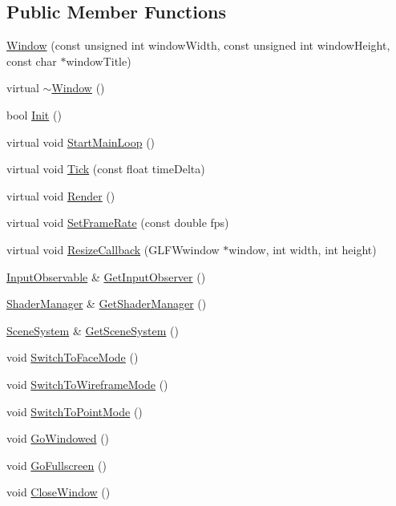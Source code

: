 \subsection*{Public Member Functions}
\begin{DoxyCompactItemize}
\item 
\mbox{\hyperlink{classngl_1_1_window_ab16003928f7ee5751be23bd3ae14667d}{Window}} (const unsigned int window\+Width, const unsigned int window\+Height, const char $\ast$window\+Title)
\item 
virtual \mbox{\hyperlink{classngl_1_1_window_a4cc0bbb6a8683eb7feadabba9f5aab8f}{$\sim$\+Window}} ()
\item 
bool \mbox{\hyperlink{classngl_1_1_window_afbeb6963b94db2831f85fff3d9a53df5}{Init}} ()
\item 
virtual void \mbox{\hyperlink{classngl_1_1_window_a93674843d11e58d9472dca7d26638211}{Start\+Main\+Loop}} ()
\item 
virtual void \mbox{\hyperlink{classngl_1_1_window_aa75f0944d26e5161a05bacb67bf55dd5}{Tick}} (const float time\+Delta)
\item 
virtual void \mbox{\hyperlink{classngl_1_1_window_a01094d06a54253996eb2b5292b3351ef}{Render}} ()
\item 
virtual void \mbox{\hyperlink{classngl_1_1_window_acc27f50ef366e58cd449a7a639e927e1}{Set\+Frame\+Rate}} (const double fps)
\item 
virtual void \mbox{\hyperlink{classngl_1_1_window_ad5cd882ac020e43720420edf5ce37179}{Resize\+Callback}} (G\+L\+F\+Wwindow $\ast$window, int width, int height)
\item 
\mbox{\hyperlink{classngl_1_1_input_observable}{Input\+Observable}} \& \mbox{\hyperlink{classngl_1_1_window_a82e6eafdce102fde3a240a31bcc79d70}{Get\+Input\+Observer}} ()
\item 
\mbox{\hyperlink{classngl_1_1_shader_manager}{Shader\+Manager}} \& \mbox{\hyperlink{classngl_1_1_window_a673b8e3b7d1f598120ef7ea5df20b64a}{Get\+Shader\+Manager}} ()
\item 
\mbox{\hyperlink{classngl_1_1_scene_system}{Scene\+System}} \& \mbox{\hyperlink{classngl_1_1_window_a2ab238e35cd9cdc3863ccf16cae5992a}{Get\+Scene\+System}} ()
\item 
void \mbox{\hyperlink{classngl_1_1_window_a2904a42ae067cc48627d0742518bc341}{Switch\+To\+Face\+Mode}} ()
\item 
void \mbox{\hyperlink{classngl_1_1_window_a21347e984afe3a5fe028725c4e93b3e8}{Switch\+To\+Wireframe\+Mode}} ()
\item 
void \mbox{\hyperlink{classngl_1_1_window_a6f4f1dfd618b0c9f3f2b548b5533d44e}{Switch\+To\+Point\+Mode}} ()
\item 
void \mbox{\hyperlink{classngl_1_1_window_afc3c6cdad0a070a873c4f5a513eec611}{Go\+Windowed}} ()
\item 
void \mbox{\hyperlink{classngl_1_1_window_a31ef8f309f257b56b2a3c1a091f8a039}{Go\+Fullscreen}} ()
\item 
void \mbox{\hyperlink{classngl_1_1_window_a1b278686756a2ef16d2100edc2022470}{Close\+Window}} ()
\end{DoxyCompactItemize}

